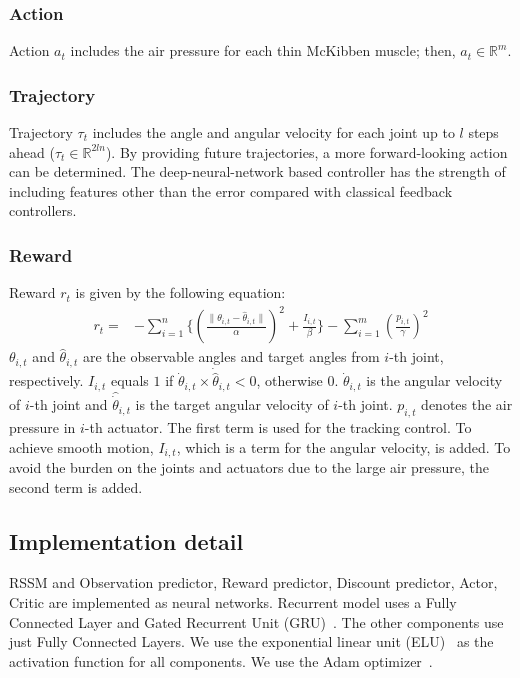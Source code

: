 \documentclass[letterpaper, 10 pt, conference]{ieeeconf}  %
\begin{document}
\subsubsection{Action}
Action $a_t$ includes the air pressure for each thin McKibben muscle; then, $a_t \in \mathbb{R}^m$.

\subsubsection{Trajectory}
Trajectory $\tau_t$ includes the angle and angular velocity for each joint up to $l$ steps ahead ($\tau_t \in \mathbb{R}^{2ln}$). By providing future trajectories, a more forward-looking action can be determined. The deep-neural-network based controller has the strength of including features other than the error compared with classical feedback controllers.

\subsubsection{Reward}
Reward $r_t$ is given by the following equation:
\begin{equation}
\begin{split}
    r_t = &-\sum_{i=1}^{n}\{(\frac{\|\theta_{i,t}-\hat{\theta}_{i,t}\|}{\alpha})^2+\frac{I_{i,t}}{\beta}\} -\sum_{i=1}^{m}(\frac{p_{i,t}}{\gamma})^2
\end{split}
\end{equation}
$\theta_{i,t}$ and $\hat{\theta}_{i,t}$ are the observable angles and target angles from $i$-th joint, respectively. $I_{i,t}$ equals $1$ if $\dot{\theta}_{i,t} \times \dot{\hat{\theta}}_{i,t} < 0$, otherwise $0$. $\dot{\theta}_{i,t}$ is the angular velocity of $i$-th joint and $\hat{\dot{\theta}}_{i,t}$ is the target angular velocity of $i$-th joint. $p_{i,t}$ denotes the air pressure in $i$-th actuator. The first term is used for the tracking control. To achieve smooth motion, $I_{i,t}$, which is a term for the angular velocity, is added. To avoid the burden on the joints and actuators due to the large air pressure, the second term is added.

\subsection{Implementation detail}
RSSM and Observation predictor, Reward predictor, Discount predictor, Actor, Critic are implemented as neural networks. Recurrent model uses a Fully Connected Layer and Gated Recurrent Unit (GRU)~\cite{cho2014learning}. The other components use just Fully Connected Layers. We use the exponential linear unit (ELU)~\cite{clevert2015fast} as the activation function for all components. We use the Adam optimizer~\cite{kingma2014adam}.
\end{document}
